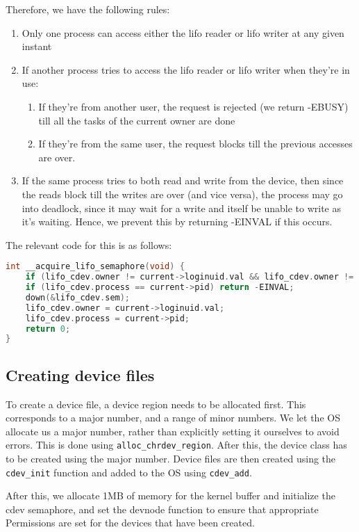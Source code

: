 \documentclass[12pt]{article}
\begin{document}
Therefore, we have the following rules:
\begin{enumerate}
\item Only one process can access either the lifo reader or lifo writer at any given instant
\item If another process tries to access the lifo reader or lifo writer when they're in use:
\begin{enumerate}
    \item If they're from another user, the request is rejected (we return -EBUSY) till all the 
      tasks of the current owner are done
  \item If they're from the same user, the request blocks till the previous accesses are over.
\end{enumerate}
\item If the same process tries to both read and write from the device, then
since the reads block till the writes are over (and vice versa), the process
may go into deadlock, since it may wait for a write and itself be unable to write
as it's waiting. Hence, we prevent this by returning -EINVAL if this occurs.
\end{enumerate}

The relevant code for this is as follows:

\begin{lstlisting}[language=C]
int __acquire_lifo_semaphore(void) {
	if (lifo_cdev.owner != current->loginuid.val && lifo_cdev.owner != 0) return -EBUSY;
	if (lifo_cdev.process == current->pid) return -EINVAL;
	down(&lifo_cdev.sem);
	lifo_cdev.owner = current->loginuid.val;
	lifo_cdev.process = current->pid;
	return 0;
}
\end{lstlisting}

\subsection{Creating device files}

To create a device file, a device region needs to be allocated first. This 
corresponds to a major number, and a range of minor numbers. We let the OS 
allocate us a major number, rather than explicitly setting it ourselves to 
avoid errors. This is done using \texttt{alloc\_chrdev\_region}. After this, the
device class has to be created using the major number. Device files are then 
created using the \texttt{cdev\_init} function and added to the OS using \texttt{cdev\_add}.

After this, we allocate 1MB of memory for the kernel buffer and initialize the 
cdev semaphore, and set the devnode function to ensure that appropriate Permissions
are set for the devices that have been created.
\end{document}

